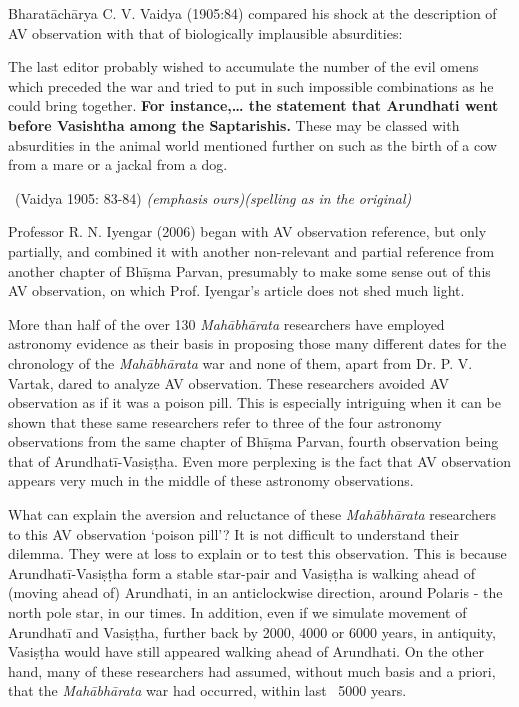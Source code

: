 Bharatāchārya C. V. Vaidya (1905:84) compared his shock at the description of AV observation with that of biologically implausible absurdities:

\begin{myquote}
The last editor probably wished to accumulate the number of the evil omens which preceded the war and tried to put in such impossible combinations as he could bring together. \textbf{For instance,… the statement that Arundhati went before Vasishtha among the Saptarishis.} These may be classed with absurdities in the animal world mentioned further on such as the birth of a cow from a mare or a jackal from a dog. 

~\hfill (Vaidya 1905: 83-84) \textit{(emphasis ours)(spelling as in the original)}
\end{myquote}

\newpage

Professor R. N. Iyengar (2006) began with AV observation reference, but only partially, and combined it with another non-relevant and partial reference from another chapter of Bhīṣma Parvan, presumably to make some sense out of this AV observation, on which Prof. Iyengar’s article does not shed much light.

More than half of the over 130 \textit{Mahābhārata} researchers have employed astronomy evidence as their basis in proposing those many different dates for the chronology of the \textit{Mahābhārata} war and none of them, apart from Dr. P. V. Vartak, dared to analyze AV observation. These researchers avoided AV observation as if it was a poison pill. This is especially intriguing when it can be shown that these same researchers refer to three of the four astronomy observations from the same chapter of Bhīṣma Parvan, fourth observation being that of Arundhatī-Vasiṣṭha. Even more perplexing is the fact that AV observation appears very much in the middle of these astronomy observations.

What can explain the aversion and reluctance of these \textit{Mahābhārata} researchers to this AV observation ‘poison pill’? It is not difficult to understand their dilemma. They were at loss to explain or to test this observation. This is because Arundhatī-Vasiṣṭha form a stable star-pair and Vasiṣṭha is walking ahead of (moving ahead of) Arundhati, in an anticlockwise direction, around Polaris - the north pole star, in our times. In addition, even if we simulate movement of Arundhatī and Vasiṣṭha, further back by 2000, 4000 or 6000 years, in antiquity, Vasiṣṭha would have still appeared walking ahead of Arundhati. On the other hand, many of these researchers had assumed, without much basis and a priori, that the \textit{Mahābhārata} war had occurred, within last ~5000 years.

